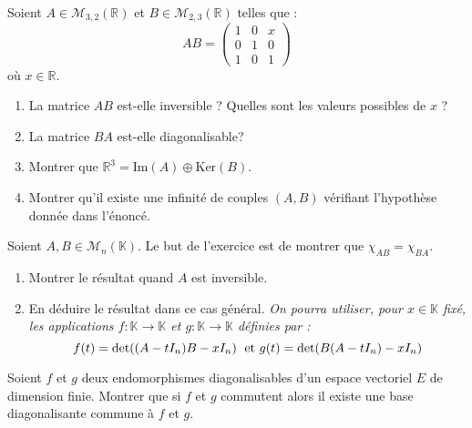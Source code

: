 \documentclass[a4paper,10pt]{report}
\begin{document}
\begin{Exa}[\ding{80}] Soient $A \in \mathcal{M}_{3,2}(\mathbb{R})$ et $B \in \mathcal{M}_{2,3}(\mathbb{R})$ telles que :
$$ AB = \begin{pmatrix}
1 & 0 & x \\
0 & 1 & 0 \\
1 & 0 & 1 
\end{pmatrix}$$
où $x \in \mathbb{R}$.
\begin{enumerate}
\item La matrice $AB$ est-elle inversible ? Quelles sont les valeurs possibles de $x$ ?
\item La matrice $BA$ est-elle diagonalisable?
\item Montrer que $\mathbb{R}^3 = \textrm{Im}(A) \oplus \textrm{Ker}(B)$.
\item Montrer qu'il existe une infinité de couples $(A,B)$ vérifiant l'hypothèse donnée dans l'énoncé.
\end{enumerate}
\end{Exa}



\begin{Exa} Soient $A,B \in \mathcal{M}_{n}(\mathbb{K})$. Le but de l'exercice est de montrer que $\chi_{AB} = \chi_{BA}$.
\begin{enumerate}
\item Montrer le résultat quand $A$ est inversible.
\item En déduire le résultat dans ce cas général. \textit{On pourra utiliser, pour $x \in \mathbb{K}$ fixé, les applications $f : \mathbb{K} \rightarrow \mathbb{K}$ et $g : \mathbb{K} \rightarrow \mathbb{K}$ définies par :}
$$ f(t) = \textrm{det}((A-t I_n)B -x I_n) \; \hbox{ et } g(t) = \textrm{det}(B(A-tI_n)-xI_n)$$
\end{enumerate}
\end{Exa}


\begin{Exa}[\ding{80}]  Soient $f$ et $g$ deux endomorphismes diagonalisables d'un espace vectoriel $E$ de dimension finie. Montrer que si $f$ et $g$ commutent alors il existe une base diagonalisante commune à $f$ et $g$.
\end{Exa}
\end{document}

